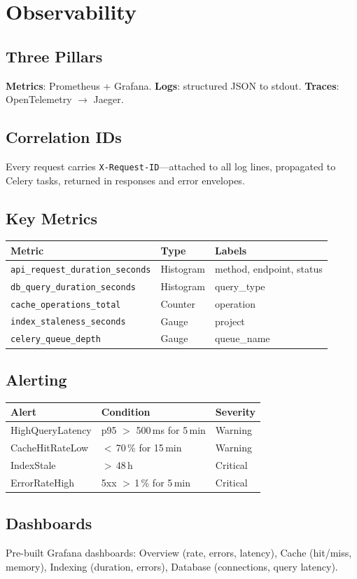 \chapter{Observability}

\section{Three Pillars}
\textbf{Metrics}: Prometheus + Grafana.
\textbf{Logs}: structured JSON to stdout.
\textbf{Traces}: OpenTelemetry $\to$ Jaeger.

\section{Correlation IDs}
Every request carries \texttt{X-Request-ID}---attached to all log lines,
propagated to Celery tasks, returned in responses and error envelopes.

\section{Key Metrics}

\begin{table}[h]
\centering
\begin{tabular}{@{}lll@{}}
\toprule
\textbf{Metric} & \textbf{Type} & \textbf{Labels} \\
\midrule
\texttt{api\_request\_duration\_seconds} & Histogram & method, endpoint, status \\
\texttt{db\_query\_duration\_seconds}    & Histogram & query\_type \\
\texttt{cache\_operations\_total}        & Counter   & operation \\
\texttt{index\_staleness\_seconds}       & Gauge     & project \\
\texttt{celery\_queue\_depth}            & Gauge     & queue\_name \\
\bottomrule
\end{tabular}
\end{table}

\section{Alerting}

\begin{table}[h]
\centering
\begin{tabular}{@{}lll@{}}
\toprule
\textbf{Alert} & \textbf{Condition} & \textbf{Severity} \\
\midrule
HighQueryLatency & p95 $>$ 500\,ms for 5\,min & Warning \\
CacheHitRateLow  & $<$\,70\,\% for 15\,min     & Warning \\
IndexStale        & $>$\,48\,h                  & Critical \\
ErrorRateHigh     & 5xx $>$\,1\,\% for 5\,min  & Critical \\
\bottomrule
\end{tabular}
\end{table}

\section{Dashboards}
Pre-built Grafana dashboards: Overview (rate, errors, latency), Cache
(hit/miss, memory), Indexing (duration, errors), Database (connections,
query latency).
